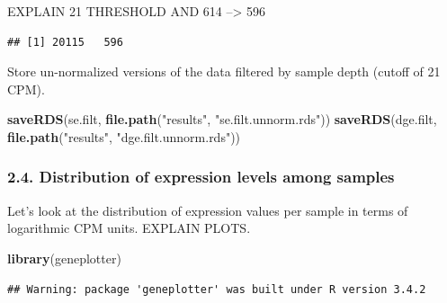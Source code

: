 \documentclass[]{article}
\newenvironment{Shaded}{\begin{snugshade}}{\end{snugshade}}
\newcommand{\KeywordTok}[1]{\textcolor[rgb]{0.13,0.29,0.53}{\textbf{{#1}}}}
\newcommand{\DecValTok}[1]{\textcolor[rgb]{0.00,0.00,0.81}{{#1}}}
\newcommand{\FloatTok}[1]{\textcolor[rgb]{0.00,0.00,0.81}{{#1}}}
\newcommand{\StringTok}[1]{\textcolor[rgb]{0.31,0.60,0.02}{{#1}}}
\newcommand{\NormalTok}[1]{{#1}}
\begin{document}
EXPLAIN 21 THRESHOLD AND 614 --\textgreater{} 596

\begin{Shaded}
\end{Shaded}

\begin{verbatim}
## [1] 20115   596
\end{verbatim}

Store un-normalized versions of the data filtered by sample depth
(cutoff of 21 CPM).

\begin{Shaded}
\begin{Highlighting}[]
\KeywordTok{saveRDS}\NormalTok{(se.filt, }\KeywordTok{file.path}\NormalTok{(}\StringTok{"results"}\NormalTok{, }\StringTok{"se.filt.unnorm.rds"}\NormalTok{))}
\KeywordTok{saveRDS}\NormalTok{(dge.filt, }\KeywordTok{file.path}\NormalTok{(}\StringTok{"results"}\NormalTok{, }\StringTok{"dge.filt.unnorm.rds"}\NormalTok{))}
\end{Highlighting}
\end{Shaded}

\subsubsection{2.4. Distribution of expression levels among
samples}\label{distribution-of-expression-levels-among-samples}

Let's look at the distribution of expression values per sample in terms
of logarithmic CPM units. EXPLAIN PLOTS.

\begin{Shaded}
\begin{Highlighting}[]
\KeywordTok{library}\NormalTok{(geneplotter)}
\end{Highlighting}
\end{Shaded}

\begin{verbatim}
## Warning: package 'geneplotter' was built under R version 3.4.2
\end{verbatim}
\end{document}
